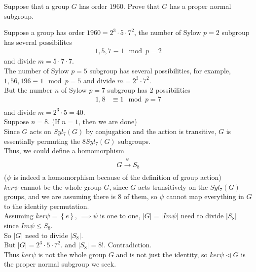 \documentclass{article}
\begin{document}
\begin{homeworkProblem}
    Suppose that a group $G$ has order $1960$. Prove that $G$ has a proper normal subgroup.\\
    \solution

    Suppose a group has order $1960 = 2^3 \cdot 5 \cdot 7^2$, 
    the number of Sylow $p=2$ subgroup has several possibilites 
    \begin{align}
        1,5,7 \equiv 1 \mod p = 2
    \end{align}
    and divide $m = 5 \cdot 7 \cdot 7$.\\
    The number of Sylow $p=5$ subgroup has several possibilities, 
    for example, $1,56, 196 \equiv 1 \mod p = 5$
    and divide $m = 2^3 \cdot 7^2$.\\
    But the number $n$ of Sylow $p = 7$ subgroup has $2$ 
    possibilities 
    \begin{align}
        1,8 &\equiv 1 \mod p = 7\\
    \end{align}
    and divide $m = 2^3 \cdot 5 = 40$.\\
    Suppose $n = 8$. (If $n=1$, then we are done)\\
    Since $G$ acts on $Syl_7 (G)$ by conjugation 
    and the action is transitive, $G$ is 
    essentially permuting the $8 Syl_7 (G)$ subgroups.\\
    Thus, we could define a homomorphism
    \begin{align}
        G \xrightarrow[]{\psi} S_8
    \end{align}
    ($\psi$ is indeed a homomorphism 
    because of the definition of group action)\\
    $ker \psi$ cannot be the whole group $G$, 
    since $G$ acts transitively on the 
    $Syl_7 (G)$ groups, and we are assuming 
    there is $8$ of them, 
    so $\psi$ cannot map everything in $G$ to the identity permutation.\\

    Assuming $ker \psi = \left\{ e \right\}$, $\implies \psi$ is one to one,
    $\lvert G \rvert = \lvert Im \psi \rvert$ need to divide 
    $\lvert S_8 \rvert$ since $Im \psi \leq S_8$.\\
    So $\lvert G \rvert$ need to divide $\lvert S_8 \rvert$.\\
    But $\lvert G \rvert = 2^3 \cdot 5 \cdot 7^2$.
    and $\lvert S_8\rvert = 8!$.
    Contradiction.\\

    Thus $ker \psi$ is not the whole group
    $G$ and is not just the identity,
    so $ker \psi \lhd G$
    is the proper normal subgroup we seek.
    


    
\end{homeworkProblem}
\end{document}

